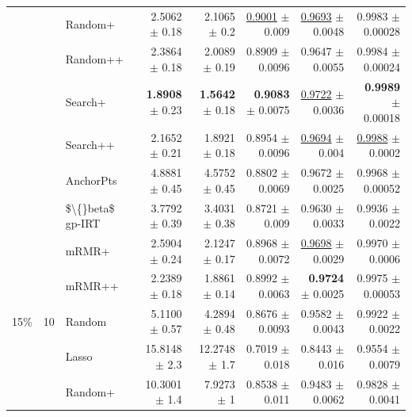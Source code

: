 \begin{longtable}{llp{}rrrrr}
 &  & Random+ & 2.5062 {\scriptsize $\pm$ 0.18} & 2.1065 {\scriptsize $\pm$ 0.2} & \underline{0.9001} {\scriptsize $\pm$ 0.009} & \underline{0.9693} {\scriptsize $\pm$ 0.0048} & 0.9983 {\scriptsize $\pm$ 0.00028} \\
 &  & Random++ & 2.3864 {\scriptsize $\pm$ 0.18} & 2.0089 {\scriptsize $\pm$ 0.19} & 0.8909 {\scriptsize $\pm$ 0.0096} & 0.9647 {\scriptsize $\pm$ 0.0055} & 0.9984 {\scriptsize $\pm$ 0.00024} \\
 &  & Search+ & \textbf{1.8908} {\scriptsize $\pm$ 0.23} & \textbf{1.5642} {\scriptsize $\pm$ 0.18} & \textbf{0.9083} {\scriptsize $\pm$ 0.0075} & \underline{0.9722} {\scriptsize $\pm$ 0.0036} & \textbf{0.9989} {\scriptsize $\pm$ 0.00018} \\
 &  & Search++ & 2.1652 {\scriptsize $\pm$ 0.21} & 1.8921 {\scriptsize $\pm$ 0.18} & 0.8954 {\scriptsize $\pm$ 0.0096} & \underline{0.9694} {\scriptsize $\pm$ 0.004} & \underline{0.9988} {\scriptsize $\pm$ 0.0002} \\
 &  & AnchorPts & 4.8881 {\scriptsize $\pm$ 0.45} & 4.5752 {\scriptsize $\pm$ 0.45} & 0.8802 {\scriptsize $\pm$ 0.0069} & 0.9672 {\scriptsize $\pm$ 0.0025} & 0.9968 {\scriptsize $\pm$ 0.00052} \\
 &  & \$\textbackslash\{\}beta\$ gp-IRT & 3.7792 {\scriptsize $\pm$ 0.39} & 3.4031 {\scriptsize $\pm$ 0.38} & 0.8721 {\scriptsize $\pm$ 0.009} & 0.9630 {\scriptsize $\pm$ 0.0033} & 0.9936 {\scriptsize $\pm$ 0.0022} \\
 &  & mRMR+ & 2.5904 {\scriptsize $\pm$ 0.24} & 2.1247 {\scriptsize $\pm$ 0.17} & 0.8968 {\scriptsize $\pm$ 0.0072} & \underline{0.9698} {\scriptsize $\pm$ 0.0029} & 0.9970 {\scriptsize $\pm$ 0.0006} \\
 &  & mRMR++ & 2.2389 {\scriptsize $\pm$ 0.18} & 1.8861 {\scriptsize $\pm$ 0.14} & 0.8992 {\scriptsize $\pm$ 0.0063} & \textbf{0.9724} {\scriptsize $\pm$ 0.0025} & 0.9975 {\scriptsize $\pm$ 0.00053} \\
\midrule
15\% & 10 & Random & 5.1100 {\scriptsize $\pm$ 0.57} & 4.2894 {\scriptsize $\pm$ 0.48} & 0.8676 {\scriptsize $\pm$ 0.0093} & 0.9582 {\scriptsize $\pm$ 0.0043} & 0.9922 {\scriptsize $\pm$ 0.0022} \\
 &  & Lasso & 15.8148 {\scriptsize $\pm$ 2.3} & 12.2748 {\scriptsize $\pm$ 1.7} & 0.7019 {\scriptsize $\pm$ 0.018} & 0.8443 {\scriptsize $\pm$ 0.016} & 0.9554 {\scriptsize $\pm$ 0.0079} \\
 &  & Random+ & 10.3001 {\scriptsize $\pm$ 1.4} & 7.9273 {\scriptsize $\pm$ 1} & 0.8538 {\scriptsize $\pm$ 0.011} & 0.9483 {\scriptsize $\pm$ 0.0062} & 0.9828 {\scriptsize $\pm$ 0.0041} \\

\end{longtable}
